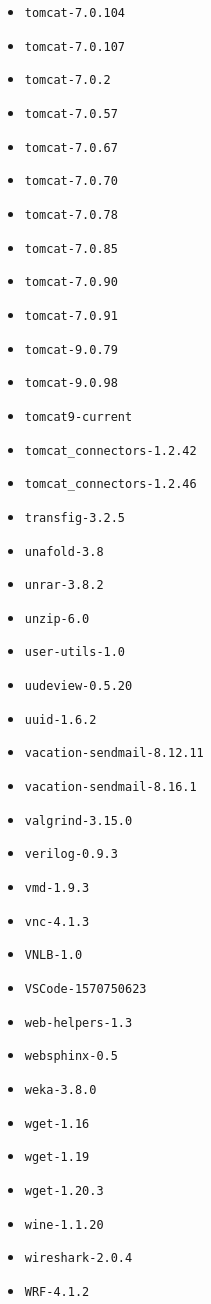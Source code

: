 \begin{multicols}{3}
\begin{itemize}
\item \verb|tomcat-7.0.104|
\item \verb|tomcat-7.0.107|
\item \verb|tomcat-7.0.2|
\item \verb|tomcat-7.0.57|
\item \verb|tomcat-7.0.67|
\item \verb|tomcat-7.0.70|
\item \verb|tomcat-7.0.78|
\item \verb|tomcat-7.0.85|
\item \verb|tomcat-7.0.90|
\item \verb|tomcat-7.0.91|
\item \verb|tomcat-9.0.79|
\item \verb|tomcat-9.0.98|
\item \verb|tomcat9-current|
\item \verb|tomcat_connectors-1.2.42|
\item \verb|tomcat_connectors-1.2.46|
\item \verb|transfig-3.2.5|
\item \verb|unafold-3.8|
\item \verb|unrar-3.8.2|
\item \verb|unzip-6.0|
\item \verb|user-utils-1.0|
\item \verb|uudeview-0.5.20|
\item \verb|uuid-1.6.2|
\item \verb|vacation-sendmail-8.12.11|
\item \verb|vacation-sendmail-8.16.1|
\item \verb|valgrind-3.15.0|
\item \verb|verilog-0.9.3|
\item \verb|vmd-1.9.3|
\item \verb|vnc-4.1.3|
\item \verb|VNLB-1.0|
\item \verb|VSCode-1570750623|
\item \verb|web-helpers-1.3|
\item \verb|websphinx-0.5|
\item \verb|weka-3.8.0|
\item \verb|wget-1.16|
\item \verb|wget-1.19|
\item \verb|wget-1.20.3|
\item \verb|wine-1.1.20|
\item \verb|wireshark-2.0.4|
\item \verb|WRF-4.1.2|

\end{itemize}
\end{multicols}
